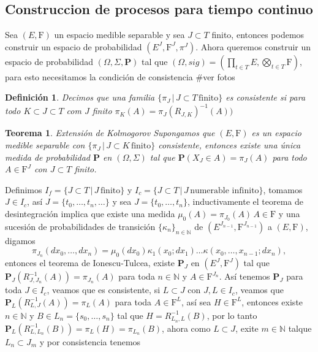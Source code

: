 \documentclass[letterpaper]{article}
\newtheorem{teorema}{Teorema}[section]
\newtheorem{def.}{Definici\'on}[section]
\newcommand{\nat}{\ensuremath{ \mathbb N }}
\newcommand{\prob}{\textbf{P}}
\newcommand{\dem}{{\noindent \sc Demostraci\'on. }}
\newcommand{\om}{\ensuremath{\Omega}}
\newcommand{\sig}{\ensuremath{\Sigma}}
\begin{document}
\subsection{Construccion de procesos para tiempo continuo}
\label{sec:org55880a1}
Sea \((E,\mathrm{F})\) un espacio medible separable y sea \(J\subset T\) finito, entonces podemos construir un espacio de probabilidad \((E^{J},\mathrm{F}^{J},\pi^{J})\). Ahora queremos construir un espacio de probabilidad \((\om,\sig,\prob)\) tal que \((\om,sig)=(\prod_{t\in T}E,\bigotimes_{t\in T}\mathrm{F})\), para esto necesitamos la condición de consistencia
\#ver fotos
\begin{def.}
Decimos que una familia \(\{\pi_J\,\vert\,J\subset T\,\text{finito}\}\) es consistente si para todo \(K\subset J\subset T\) com \(J\) finito
\(\pi_K(A)=\pi_J(R_{J,K})^{-1}(A))\)
\end{def.}
\begin{teorema}{Extensión de Kolmogorov}
Supongamos que $(E,\mathrm{F})$ es un espacio medible separable con $\{\pi_J\,\vert\, J\subset K\,\text{finito}\}$ consistente, entonces existe una única medida de probabilidad $\prob$ en $(\om,\sig)$ tal que $\prob(X_J\in A)=\pi_J(A)$ para todo $A\in\mathrm{F}^J$ con $J\subset T$ finito.
\end{teorema}
\noindent\dem Definimos \(I_f=\{J\subset T\,\vert\,J\,\text{finito}\}\) y \(I_c=\{J\subset T\,\vert\,J\,\text{numerable infinito}\}\), tomamos \(J\in I_c\), así \(J=\{t_0,\dots,t_n,\dots\}\) y sea \(J=\{t_0,\dots,t_n\}\), inductivamente el teorema de desintegración implica que existe una medida \(\mu_0(A)=\pi_{J_0}(A)\,A\in\mathrm{F}\) y una sucesión de probabilidades de transición \(\{\kappa_n\}_{n\in\nat}\) de \((E^{J_{n-1}},\mathrm{F}^{J_{n-1}})\) a \((E,\mathrm{F})\), digamos
\[
    \pi_{J_n}(dx_0,\dots,dx_n)=\mu_0(dx_0)\kappa_1(x_0;dx_1)\dots\kappa(x_0,\dots,x_{n-1};dx_{n}),
\]
\noindent entonces el teorema de Ionescu-Tulcea, existe \(\prob_J\) en \((E^J,\mathrm{F}^J)\) tal que \(\prob_J(R^{-1}_{J,J_{n}}(A))=\pi_{J_n}(A)\) para toda \(n\in\nat\) y \(A\in\mathrm{F}^{J_n}\). Así tenemos \(\prob_J\) para toda \(J\in I_c\), veamos que es consistente, si \(L\subset J\) con \(J,L\in I_c\), veamos que \(\prob_L(R^{-1}_{L,J}(A))=\pi_{L}(A)\) para toda \(A\in\mathrm{F}^{L}\), así sea \(H\in\mathrm{F}^{L}\), entonces existe \(n\in\nat\) y \(B\in L_n=\{s_0,\dots,s_n\}\) tal que \(H=R^{-1}_{L_{n},L}(B)\), por lo tanto \(\prob_L(R^{-1}_{L,L_{n}}(B))=\pi_{L}(H)=\pi_{L_{n}}(B)\), ahora como \(L\subset J\), exite \(m\in\nat\) talque \(L_n\subset J_m\) y por consistencia tenemos
\end{document}
